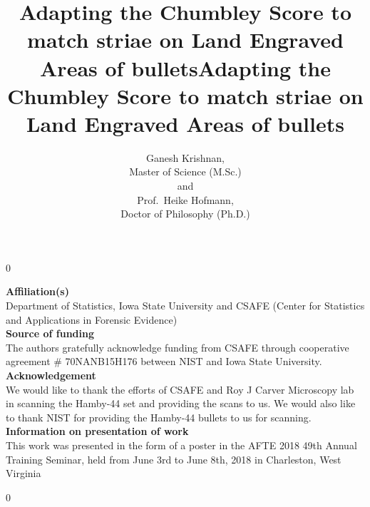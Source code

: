 \documentclass[12pt]{article}
\newcommand{\blind}{0}
\begin{document}
\def\spacingset#1{\renewcommand{\baselinestretch}%
{#1}\small\normalsize} \spacingset{1}



\blind
{
  \title{\bf Adapting the Chumbley Score to match striae on Land Engraved Areas of
bullets}

  \author{
        Ganesh Krishnan,\\ %
    Master of Science (M.Sc.)\\
     and \\     Prof.~Heike Hofmann,\\ %
    Doctor of Philosophy (Ph.D.)\\
      }
    \maketitle
  \bigskip
  \begin{center}
  {
  \textbf{Affiliation(s)}\\
  Department of Statistics, Iowa State University and CSAFE (Center for
  Statistics and Applications in Forensic Evidence)\\
  \bigskip
  \textbf{Source of funding}\\
  The authors gratefully acknowledge funding from CSAFE through
  cooperative agreement \# 70NANB15H176 between NIST and Iowa State
  University.\\
  \bigskip
  \textbf{Acknowledgement}\\
  We would like to thank the efforts of CSAFE and Roy J Carver Microscopy
  lab in scanning the Hamby-44 set and providing the scans to us. We would
  also like to thank NIST for providing the Hamby-44 bullets to us for
  scanning.\\
  \bigskip
  \textbf{Information on presentation of work}\\
  This work was presented in the form of a poster in the AFTE 2018 49th
  Annual Training Seminar, held from June 3rd to June 8th, 2018 in
  Charleston, West Virginia
  }
  \end{center}

} \fi


\newpage

\blind
{
  \bigskip
  \bigskip
  \bigskip
  \begin{center}
  \title{\LARGE\bf Adapting the Chumbley Score to match striae on Land Engraved Areas of
bullets}
  \end{center}
  \bigskip
  \maketitle
} \fi
\end{document}
